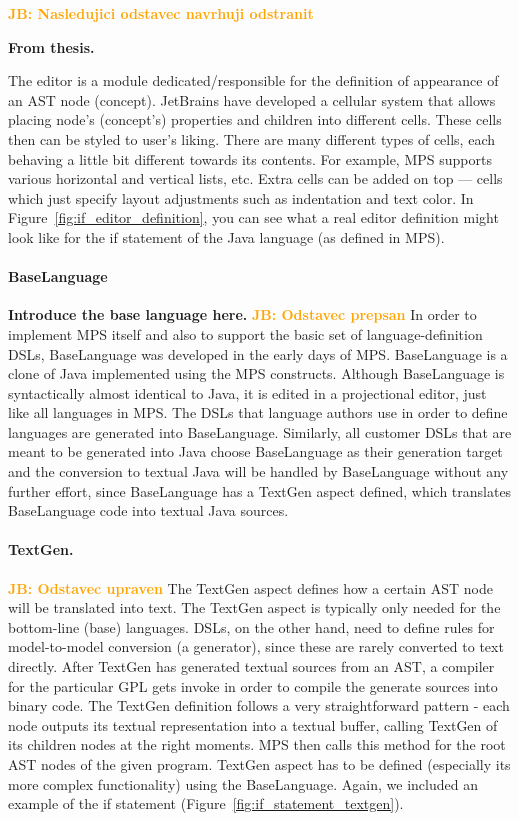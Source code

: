 \documentclass[10pt]{sigplanconf}
\newcommand{\todo}[1]{{\bfseries #1}}
\newcommand{\JB}[1]{\textcolor{orange}{\bfseries JB: #1}} %
\begin{document}
\JB{Nasledujici odstavec navrhuji odstranit}
\todo{From thesis.

The editor is a module dedicated/responsible for the definition of appearance of an AST node (concept).
JetBrains have developed a cellular system that allows placing node's (concept's) properties and children into different cells.
These cells then can be styled to user's liking.
There are many different types of cells, each behaving a little bit different towards its contents.
For example, MPS supports various horizontal and vertical lists, etc.
Extra cells can be added on top --- cells which just specify layout adjustments such as indentation and text color.
In Figure~\ref{fig:if_editor_definition}, you can see what a real editor definition might look like for the if statement of the Java language (as defined in MPS).
}

\paragraph{BaseLanguage}
\todo{Introduce the base language here.}
\JB{Odstavec prepsan}
In order to implement MPS itself and also to support the basic set of language-definition DSLs, BaseLanguage was developed in the early days of MPS. BaseLanguage is a clone of Java implemented using the MPS constructs. Although BaseLanguage is syntactically almost identical to Java, it is edited in a projectional editor, just like all languages in MPS. The DSLs that language authors use in order to define languages are generated into BaseLanguage. Similarly, all customer DSLs that are meant to be generated into Java choose BaseLanguage as their generation target and the conversion to textual Java will be handled by BaseLanguage without any further effort, since BaseLanguage has a TextGen aspect defined, which translates BaseLanguage code into textual Java sources.

\paragraph{TextGen.}
\JB{Odstavec upraven} The TextGen aspect defines how a certain AST node will be translated into text. The TextGen aspect is typically only needed for the bottom-line (base) languages. DSLs, on the other hand, need to define rules for model-to-model conversion (a generator), since these are rarely converted to text directly. After TextGen has generated textual sources from an AST, a compiler for the particular GPL gets invoke in order to compile the generate sources into binary code.
The TextGen definition follows a very straightforward pattern - each node outputs its textual representation into a textual buffer, calling TextGen of its children nodes at the right moments. MPS then calls this method for the root AST nodes of the given program.
TextGen aspect has to be defined (especially its more complex functionality) using the BaseLanguage.
Again, we included an example of the if statement (Figure~\ref{fig:if_statement_textgen}).
\end{document}
